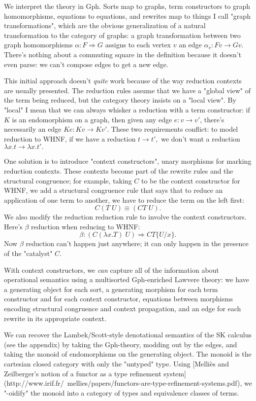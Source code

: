 \documentclass[a4paper,UKenglish]{article}
\begin{document}
We interpret the theory in Gph.  Sorts map to graphs, term constructors to graph homomorphisms, equations to equations, and rewrites map to things I call "graph transformations", which are the obvious generalization of a natural transformation to the category of graphs: a graph transformation between two graph homomorphisms $\alpha:F\Rightarrow G$ assigns to each vertex $v$ an edge
$\alpha_v:Fv \to Gv$.  There's nothing about a commuting square in the
definition because it doesn't even parse: we can't compose edges to get a new edge.

This initial approach doesn't {\em quite} work because of the way reduction contexts are usually presented.  The reduction rules assume that we have a "global view" of the term being reduced, but the category theory insists on a "local view".  By "local" I mean that we can always whisker a reduction with a term constructor: if $K$ is an endomorphism on a graph, then given any edge $e:v\to v'$, there's necessarily an edge $Ke:Kv \to Kv'.$  These two requirements conflict: to model reduction to WHNF, if we have a reduction $t \to t',$ we don't want a reduction $\lambda x.t \to \lambda x.t'.$

One solution is to introduce "context constructors", unary morphisms for marking reduction contexts.  These contexts become part of the rewrite rules and the structural congruence; for example, taking $C$ to be the context constructor for WHNF, we add a structural congruence rule that says that to reduce an application of one term to another, we have to reduce the term on the left first: $$C(T\; U) \equiv (CT\; U).$$
We also modify the reduction reduction rule to involve the context constructors.  Here's $\beta$ reduction when reducing to WHNF: $$ \beta: (C(\lambda x.T)\; U) \Rightarrow CT\{U/x\}. $$
Now $\beta$ reduction can't happen just anywhere; it can only happen in the presence of the "catalyst" $C$.

With context constructors, we {\em can} capture all of the information about operational semantics using a multisorted Gph-enriched Lawvere theory: we have a generating object for each sort, a generating morphism for each term constructor and for each context constructor, equations between morphisms encoding structural congruence and context propagation, and an edge for each rewrite in its appropriate context.


We can recover the Lambek/Scott-style denotational semantics of the SK calculus (see the appendix) by taking the Gph-theory, modding out by the edges, and taking the monoid of endomorphisms on the generating object.  The monoid is the cartesian closed category with only the "untyped" type.  Using [Melliès and Zeilberger's notion of a functor
as a type refinement system](http://www.irif.fr/~mellies/papers/functors-are-type-refinement-systems.pdf), we "-oidify" the monoid into a category of types and equivalence classes of terms.
\end{document}
